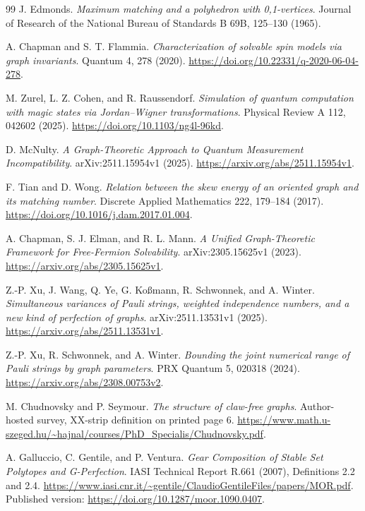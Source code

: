 \documentclass[11pt,a4paper]{article}
\theoremstyle{remark}\newtheorem{remark}[theorem]{Remark}
\begin{document}
\begin{thebibliography}{99}
J. Edmonds.
\emph{Maximum matching and a polyhedron with 0,1-vertices}.
Journal of Research of the National Bureau of Standards B 69B,
125--130 (1965).

A. Chapman and S. T. Flammia.
\emph{Characterization of solvable spin models via graph invariants}.
Quantum 4, 278 (2020).
\url{https://doi.org/10.22331/q-2020-06-04-278}.

M. Zurel, L. Z. Cohen, and R. Raussendorf.
\emph{Simulation of quantum computation with magic states via
Jordan--Wigner transformations}.
Physical Review A 112, 042602 (2025).
\url{https://doi.org/10.1103/ng4l-96kd}.

D. McNulty.
\emph{A Graph-Theoretic Approach to Quantum Measurement Incompatibility}.
arXiv:2511.15954v1 (2025).
\url{https://arxiv.org/abs/2511.15954v1}.

F. Tian and D. Wong.
\emph{Relation between the skew energy of an oriented graph and its
matching number}.
Discrete Applied Mathematics 222, 179--184 (2017).
\url{https://doi.org/10.1016/j.dam.2017.01.004}.

A. Chapman, S. J. Elman, and R. L. Mann.
\emph{A Unified Graph-Theoretic Framework for Free-Fermion Solvability}.
arXiv:2305.15625v1 (2023).
\url{https://arxiv.org/abs/2305.15625v1}.

Z.-P. Xu, J. Wang, Q. Ye, G. Ko\ss mann, R. Schwonnek, and A. Winter.
\emph{Simultaneous variances of Pauli strings, weighted independence
numbers, and a new kind of perfection of graphs}.
arXiv:2511.13531v1 (2025).
\url{https://arxiv.org/abs/2511.13531v1}.

Z.-P. Xu, R. Schwonnek, and A. Winter.
\emph{Bounding the joint numerical range of Pauli strings by graph parameters}.
PRX Quantum 5, 020318 (2024).
\url{https://arxiv.org/abs/2308.00753v2}.

M. Chudnovsky and P. Seymour.
\emph{The structure of claw-free graphs}. Author-hosted survey,
XX-strip definition on printed page 6.
\url{https://www.math.u-szeged.hu/~hajnal/courses/PhD_Specialis/Chudnovsky.pdf}.

A. Galluccio, C. Gentile, and P. Ventura.
\emph{Gear Composition of Stable Set Polytopes and G-Perfection}.
IASI Technical Report R.661 (2007), Definitions 2.2 and 2.4.
\url{https://www.iasi.cnr.it/~gentile/ClaudioGentileFiles/papers/MOR.pdf}.
Published version: \url{https://doi.org/10.1287/moor.1090.0407}.
\end{thebibliography}
\end{document}
